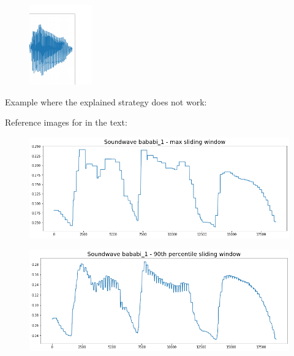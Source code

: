 \begin{figure}[h]
	\centering
	\includegraphics[width=0.7\linewidth]{screenshot011}
	\caption{}
	\label{fig:example where gardient doesnt work}
\end{figure}



Example where the explained strategy does not work: %


Reference images for in the text:
\begin{figure}
	\centering
	\includegraphics[width=0.7\linewidth]{screenshot012}
	\caption{}
	\label{fig:max sliding window}
\end{figure}

\begin{figure}
	\centering
	\includegraphics[width=0.7\linewidth]{screenshot013}
	\caption{}
	\label{fig:90th percentile}
\end{figure}

